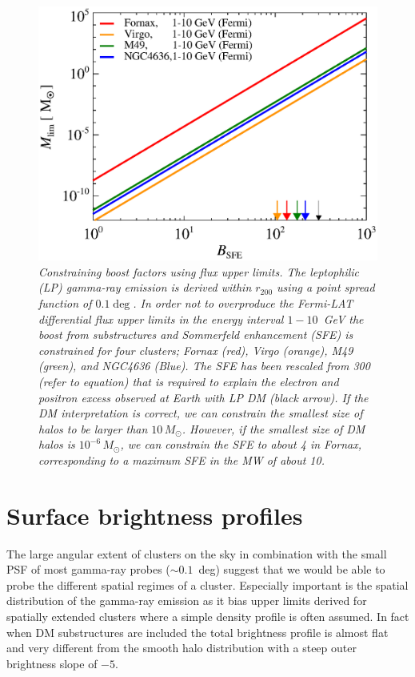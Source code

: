 \documentclass[10pt,aps,pra,reprint,amsmath,amsfonts,amssymb,showpacs]{revtex4-1}
\newcommand{\msun}{M_\odot}
\newcommand{\rvir}{r_{200}}
\begin{document}
\begin{figure}%
 \includegraphics[width=0.99\columnwidth]{figures/LP.const.diff.v9.0.1deg.1.6T.SubMass.SF300.IR2.noMW.woGal.eps}
\caption{\it Constraining boost factors using flux upper limits. The
  leptophilic (LP) gamma-ray emission is derived within $\rvir$ using
  a point spread function of $0.1\deg$. In order not to overproduce
  the Fermi-LAT differential flux upper limits in the energy interval
  $1-10$~GeV the boost from substructures and Sommerfeld enhancement
  (SFE) is constrained for four clusters; Fornax (red), Virgo
  (orange), M49 (green), and NGC4636 (Blue). The SFE has been rescaled
  from 300 (refer to equation) that is required to explain the
  electron and positron excess observed at Earth with LP DM (black
  arrow). If the DM interpretation is correct, we can constrain the
  smallest size of halos to be larger than $10\,\msun$. However, if
  the smallest size of DM halos is $10^{-6}\,\msun$, we can constrain
  the SFE to about 4 in Fornax, corresponding to a maximum SFE in the
  MW of about 10.}
 \label{fig:boost_const}
\end{figure}


\section{Surface brightness profiles}
\label{sect:spatial}
The large angular extent of clusters on the sky in combination with
the small PSF of most gamma-ray probes ($\sim 0.1$~deg) suggest that
we would be able to probe the different spatial regimes of a
cluster. Especially important is the spatial distribution of the
gamma-ray emission as it bias upper limits derived for spatially
extended clusters where a simple density profile is often assumed. In
fact when DM substructures are included the total brightness profile
is almost flat and very different from the smooth halo distribution
with a steep outer brightness slope of $-5$.
\end{document}
